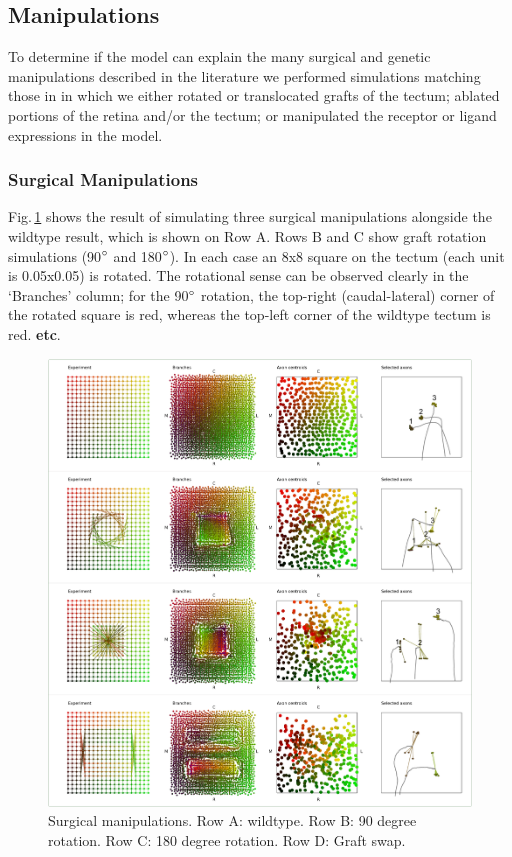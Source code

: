 \documentclass[11pt, a4paper]{article}
\begin{document}
\subsection*{Manipulations}

To determine if the model can explain the many surgical and genetic
manipulations described in the literature
\citep*[for a review, see][]{goodhill_retinotectal_1999} we performed
simulations matching those in \citet{simpson_simple_2011} in which we either
rotated or translocated grafts of the tectum; ablated portions of the retina
and/or the tectum; or manipulated the receptor or ligand expressions in the
model.

\subsubsection*{Surgical Manipulations}

Fig.\,\ref{f:surg1} shows the result of simulating three surgical
manipulations alongside the wildtype result, which is shown on Row A. Rows B
and C show graft rotation simulations (90$\degree$ and 180$\degree$). In each
case an 8x8 square on the tectum (each unit is 0.05x0.05) is rotated. The
rotational sense can be observed clearly in the `Branches' column; for the
90$\degree$ rotation, the top-right (caudal-lateral) corner of the rotated
square is red, whereas the top-left corner of the wildtype tectum is red. \textbf{etc}.

\begin{figure}
\includegraphics[width=\linewidth]{./images/fig_manipulations.png}
\caption{Surgical manipulations. Row A: wildtype. Row B: 90 degree
rotation. Row C: 180 degree rotation. Row D: Graft swap.}
\label{f:surg1}
\end{figure}
\end{document}
